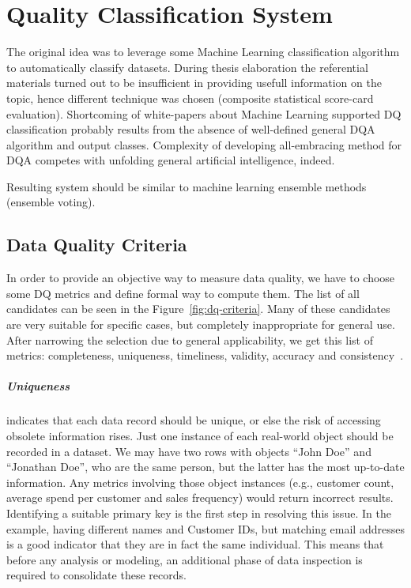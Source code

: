 \chapter{Quality Classification System}\label{ch:quality-classification-system}

The original idea was to leverage some Machine Learning classification algorithm to automatically classify datasets.
During thesis elaboration the referential materials turned out to be insufficient in providing usefull information on the topic, hence different technique was chosen (composite statistical score-card evaluation).
Shortcoming of white-papers about Machine Learning supported DQ classification probably results from the absence of well-defined general DQA algorithm and output classes.
Complexity of developing all-embracing method for DQA competes with unfolding general artificial intelligence, indeed.

Resulting system should be similar to machine learning ensemble methods (ensemble voting).

\section{Data Quality Criteria}


In order to provide an objective way to measure data quality, we have to choose some DQ metrics and define formal way to compute them.
The list of all candidates can be seen in the Figure~\ref{fig:dq-criteria}.
Many of these candidates are very suitable for specific cases, but completely inappropriate for general use.
After narrowing the selection due to general applicability, we get this list of metrics: completeness, uniqueness, timeliness, validity, accuracy and consistency~\cite{ehdi2019}.

\paragraph*{Uniqueness} indicates that each data record should be unique, or else the risk of accessing obsolete information rises.
Just one instance of each real-world object should be recorded in a dataset.
We may have two rows with objects \enquote{John Doe} and \enquote{Jonathan Doe}, who are the same person, but the latter has the most up-to-date information.
Any metrics involving those object instances (e.g., customer count, average spend per customer and sales frequency) would return incorrect results.
Identifying a suitable primary key is the first step in resolving this issue.
In the example, having different names and Customer IDs, but matching email addresses is a good indicator that they are in fact the same individual.
This means that before any analysis or modeling, an additional phase of data inspection is required to consolidate these records.

